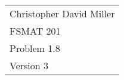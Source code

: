 \documentclass[12pt]{article}
\begin{document}
\newtheorem{prop}{Proposition}

\begin{flushright}
\begin{tabular}{l}
Christopher David Miller \\  %
FSMAT 201 \\  %
Problem 1.8 \\  %
Version 3 \\ %
\end{tabular}
\end{flushright}
\vspace{20pt}  %

\end{document}
